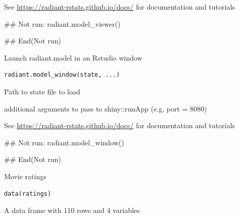\documentclass[a4paper]{book}
\begin{document}
%
\begin{Details}
See \url{https://radiant-rstats.github.io/docs/} for documentation and tutorials
\end{Details}
%
\begin{Examples}
\begin{ExampleCode}
## Not run: 
radiant.model_viewer()

## End(Not run)
\end{ExampleCode}
\end{Examples}
%
\begin{Description}
Launch radiant.model in an Rstudio window
\end{Description}
%
\begin{Usage}
\begin{verbatim}
radiant.model_window(state, ...)
\end{verbatim}
\end{Usage}
%
\begin{Arguments}
\begin{ldescription}
\item[\code{state}] Path to state file to load

\item[\code{...}] additional arguments to pass to shiny::runApp (e.g, port = 8080)
\end{ldescription}
\end{Arguments}
%
\begin{Details}
See \url{https://radiant-rstats.github.io/docs/} for documentation and tutorials
\end{Details}
%
\begin{Examples}
\begin{ExampleCode}
## Not run: 
radiant.model_window()

## End(Not run)
\end{ExampleCode}
\end{Examples}
%
\begin{Description}
Movie ratings
\end{Description}
%
\begin{Usage}
\begin{verbatim}
data(ratings)
\end{verbatim}
\end{Usage}
%
\begin{Format}
A data frame with 110 rows and 4 variables
\end{Format}
\end{document}
